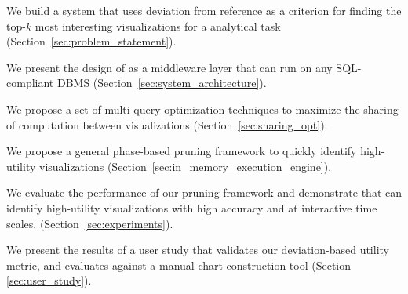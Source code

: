 \begin{denselist}
  \item We build a system that uses deviation from reference as a criterion for finding the
  top-$k$ most interesting visualizations for a analytical task (Section~\ref{sec:problem_statement}).

  \item We present the design of \SeeDB as a middleware layer that can run on any SQL-compliant DBMS 
  (Section~\ref{sec:system_architecture}).
  
  \item We propose a set of multi-query optimization techniques to maximize the sharing of 
  computation between visualizations (Section~\ref{sec:sharing_opt}).

  \item We propose a general phase-based pruning framework to quickly identify
  high-utility visualizations (Section~\ref{sec:in_memory_execution_engine}).
  \item We evaluate the performance of our pruning framework and demonstrate that \SeeDB
  can identify high-utility visualizations with high accuracy and at interactive time scales.
  (Section~\ref{sec:experiments}). 
  \item We present the results of a user study that validates our deviation-based utility metric, and
  evaluates \SeeDB against a manual chart construction tool (Section \ref{sec:user_study}).
\end{denselist}


